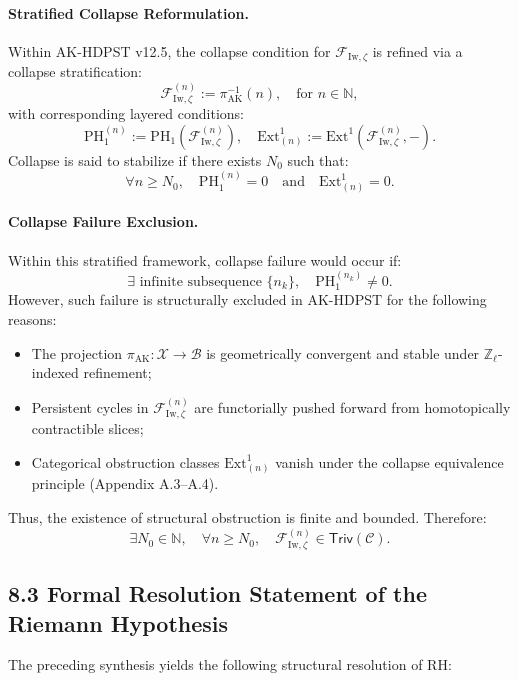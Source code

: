 \documentclass[11pt]{article}
\begin{document}
\paragraph{Stratified Collapse Reformulation.}
Within AK-HDPST v12.5, the collapse condition for $\mathcal{F}_{\mathrm{Iw}, \zeta}$ is refined via a collapse stratification:
\[
\mathcal{F}_{\mathrm{Iw}, \zeta}^{(n)} := \pi_{\mathrm{AK}}^{-1}(n), \quad \text{for } n \in \mathbb{N},
\]
with corresponding layered conditions:
\[
\mathrm{PH}_1^{(n)} := \mathrm{PH}_1(\mathcal{F}_{\mathrm{Iw}, \zeta}^{(n)}), \quad \mathrm{Ext}^1_{(n)} := \mathrm{Ext}^1(\mathcal{F}_{\mathrm{Iw}, \zeta}^{(n)}, -).
\]
Collapse is said to stabilize if there exists $N_0$ such that:
\[
\forall n \geq N_0, \quad \mathrm{PH}_1^{(n)} = 0 \quad \text{and} \quad \mathrm{Ext}^1_{(n)} = 0.
\]

\paragraph{Collapse Failure Exclusion.}
Within this stratified framework, collapse failure would occur if:
\[
\exists \text{ infinite subsequence } \{n_k\}, \quad \mathrm{PH}_1^{(n_k)} \neq 0.
\]
However, such failure is structurally excluded in AK-HDPST for the following reasons:
\begin{itemize}
    \item The projection $\pi_{\mathrm{AK}} : \mathcal{X} \to \mathcal{B}$ is geometrically convergent and stable under $\mathbb{Z}_\ell$-indexed refinement;
    \item Persistent cycles in $\mathcal{F}_{\mathrm{Iw}, \zeta}^{(n)}$ are functorially pushed forward from homotopically contractible slices;
    \item Categorical obstruction classes $\mathrm{Ext}^1_{(n)}$ vanish under the collapse equivalence principle (Appendix A.3–A.4).
\end{itemize}
Thus, the existence of structural obstruction is finite and bounded. Therefore:
\[
\exists N_0 \in \mathbb{N}, \quad \forall n \geq N_0, \quad \mathcal{F}_{\mathrm{Iw}, \zeta}^{(n)} \in \mathsf{Triv}(\mathcal{C}).
\]

\subsection*{8.3 Formal Resolution Statement of the Riemann Hypothesis}

The preceding synthesis yields the following structural resolution of RH:
\end{document}
